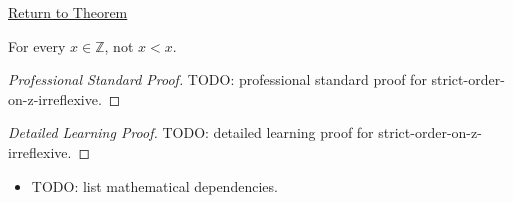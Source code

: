 \newpage
{}
\label{prf:strict-order-on-z-irreflexive}

\begin{remark*}[Return]
\hyperref[thm:strict-order-on-z-irreflexive]{Return to Theorem}
\end{remark*}

\begin{theorem*}
For every $x\in\mathbb{Z}$, not $x<x$.
\end{theorem*}

\begin{proof}[Professional Standard Proof]
\LRAProofBodyStart
TODO: professional standard proof for strict-order-on-z-irreflexive.
\end{proof}

\begin{proof}[Detailed Learning Proof]
\LRAProofBodyStart
TODO: detailed learning proof for strict-order-on-z-irreflexive.
\end{proof}

\begin{remark*}
\end{remark*}

\begin{dependencies}
\begin{itemize}
  \item TODO: list mathematical dependencies.
\end{itemize}
\end{dependencies}

\clearpage

